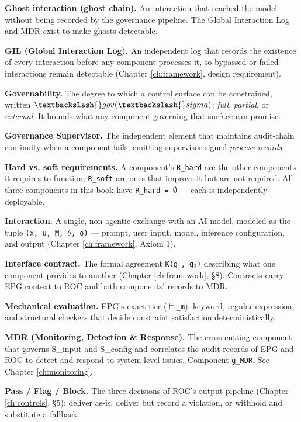 \textbf{Ghost interaction (ghost chain).} An interaction that reached the model without
being recorded by the governance pipeline. The Global Interaction Log and MDR
exist to make ghosts detectable.

\textbf{GIL (Global Interaction Log).} An independent log that records the existence of
every interaction before any component processes it, so bypassed or failed
interactions remain detectable (Chapter \ref{ch:framework}, design requirement).

\textbf{Governability.} The degree to which a control surface can be constrained,
written \texttt{$\textbackslash\{\}gov(\textbackslash\{\}sigma)$}: \emph{full}, \emph{partial}, or \emph{external}. It bounds what any component
governing that surface can promise.

\textbf{Governance Supervisor.} The independent element that maintains audit-chain
continuity when a component fails, emitting supervisor-signed \emph{process records}.

\textbf{Hard vs. soft requirements.} A component's \texttt{R\_\allowbreak{}hard} are the other components it
requires to function; \texttt{R\_\allowbreak{}soft} are ones that improve it but are not required. All
three components in this book have \texttt{R\_\allowbreak{}hard = $\emptyset$} --- each is independently
deployable.

\textbf{Interaction.} A single, non-agentic exchange with an AI model, modeled as the
tuple \texttt{(x, u, M, $\theta$, o)} --- prompt, user input, model, inference configuration, and
output (Chapter \ref{ch:framework}, Axiom 1).

\textbf{Interface contract.} The formal agreement \texttt{K(g$_1$, g$_2$)} describing what one
component provides to another (Chapter \ref{ch:framework}, \S{}8). Contracts carry EPG context to ROC
and both components' records to MDR.

\textbf{Mechanical evaluation.} EPG's exact tier (\texttt{$\vDash$\_\allowbreak{}m}): keyword, regular-expression,
and structural checkers that decide constraint satisfaction deterministically.

\textbf{MDR (Monitoring, Detection \& Response).} The cross-cutting component that
governs S\_\allowbreak{}input and S\_\allowbreak{}config and correlates the audit records of EPG and ROC to
detect and respond to system-level issues. Component \texttt{g\_\allowbreak{}MDR}. See Chapter \ref{ch:monitoring}.

\textbf{Pass / Flag / Block.} The three decisions of ROC's output pipeline (Chapter \ref{ch:controls},
\S{}5): deliver as-is, deliver but record a violation, or withhold and substitute a
fallback.

